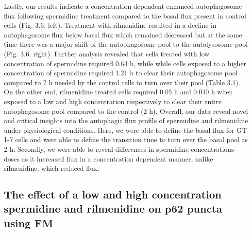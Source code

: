 {Lastly, our results indicate a concentration dependent enhanced autophagosome flux following spermidine treatment compared to the basal flux present in control cells (Fig. 3.6. left). Treatment with rilmenidine resulted in a decline in autophagosome flux below basal flux which remained decreased but at the same time there was a major shift of the autophagosome pool to the autolysosome pool (Fig. 3.6. right). Further analysis revealed that cells treated with low concentration of spermidine required 0.64 h, while while cells exposed to a higher concentration of spermidine required 1.21 h to clear their autophagosome pool compared to 2 h needed by the control cells to turn over their pool (Table 3.1). On the other end, rilmenidine treated cells required 0.05 h and 0.040 h when exposed to a low and high concentration respectively to clear their entire autophagosome pool compared to the control (2 h). Overall, our data reveal novel and critical insights into the autophagic flux profile of spermidine and rilmenidine under physiological conditions. Here, we were able to define the basal flux for GT 1-7 cells and were able to define the transition time to turn over the basal pool as 2 h. Secondly, we were able to reveal differences in spermidine concentrations doses as it increased flux in a concentration dependent manner, unlike rilmenidine, which reduced flux.

\subsection{The effect of a low and high concentration spermidine and rilmenidine on p62 puncta using FM}

}
